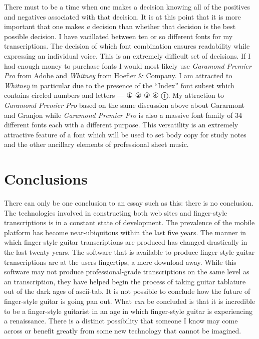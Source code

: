 \documentclass[unicode,hyperfootnotes=false,xetex,colorlinks=true,nofonts,nobib]{tufte-handout}
\newcommand{\textls}[2][5]{%
    \begingroup\addfontfeatures{LetterSpace=#1}#2\endgroup
  }
\renewcommand{\smallcapsspacing}[1]{\textls[10]{#1}}
\renewcommand{\textsc}[1]{\smallcapsspacing{\textsmallcaps{#1}}}
\begin{document}
There must to be a time when one makes a decision knowing all of the positives and negatives associated with that decision. It is at this point that it is more important that one makes \emph{a} decision than whether that decision is the best possible decision. I have vacillated between ten or so different fonts for my transcriptions. The decision of which font combination ensures readability while expressing an individual voice. This is an extremely difficult set of decisions. If I had enough money to purchase fonts I would most likely use \emph{Garamond Premier Pro} from Adobe and \emph{Whitney} from Hoefler \& Company.\autocites{garamondPremier,hoeflerWhitney} I am attracted to \emph{Whitney} in particular due to the presence of the ``Index'' font subset which contains circled numbers and letters --- {\symbolfont① ② ③ ④ Ⓣ}. My attraction to \emph{Garamond Premier Pro} based on the same discussion above about Gararmont and Granjon while \emph{Garamond Premier Pro} is also a massive font family of 34 different fonts each with a different purpose. This versatility is an extremely attractive feature of a font which will be used to set body copy for study notes and the other ancillary elements of professional sheet music.

\section{Conclusions}
\label{sec:conclusions}

There can only be one conclusion to an essay such as this: there is no conclusion. The technologies involved in constructing both web sites and finger-style transcriptions is in a constant state of development. The prevalence of the mobile platform has become near-ubiquitous within the last five years. The manner in which finger-style guitar transcriptions are produced has changed drastically in the last twenty years. The software that is available to produce finger-style guitar transcriptions are at the users fingertips, a mere download away. While this software may not produce professional-grade transcriptions on the same level as an \textsc{sel} transcription, they have helped begin the process of taking guitar tablature out of the dark ages of ascii-tab. It is not possible to conclude how the future of finger-style guitar is going pan out. What \emph{can} be concluded is that it is incredible to be a finger-style guitarist in an age in which finger-style guitar is experiencing a renaissance. There is a distinct possibility that someone I know may come across or benefit greatly from some new technology that cannot be imagined.

\nocite{alexAnderson,alexDeGrassi,andrewWhite,andyMcKee,billyMcLaughlin,adamRafferty,calumGraham,cliveCarroll,craigDAndrea,evaAtmatzidou,ewanDobson,garethPearson,happyTraum,ianEthanCase,janetFeder,jimmyWahlsteen,jonGomm,kakiKing,kellyValleau,kevinHorrigan,leoKottke,lucaStricagnoli,lucasMich,masaakiKishibe,michaelChap,michaelGul,mikeDawes,murielAnders,peppino,peterCiluzzi,peterFinger,pierre,rayMontford,pino,spencerElliot,sunghaJung,thomasLeeb,timSparks,tommyEmmanuel,trevorGH,vickiGenfan}
% 
% 
\printbibliography
\end{document}
